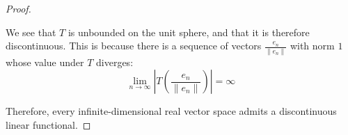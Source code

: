 \documentclass[12pt]{article}
\theoremstyle{definition}
\begin{document}
\begin{proof}
\begin{enumerate}[label=(\roman*)]
	\par We see that $T$ is unbounded on the unit sphere, and that it is therefore discontinuous. This is because there is a sequence of vectors $\frac{e_n}{\lVert e_n \rVert}$ with norm $1$ whose value under $T$ diverges:
	\[
	\lim_{n\to\infty} \left \lvert T\left ( \frac{e_n}{\lVert e_n \rVert}\right )  \right \rvert = \infty
	\]
	\end{enumerate}
	Therefore, every infinite-dimensional real vector space admits a discontinuous linear functional.
\end{proof}
\begin{thebibliography}{}


\end{thebibliography}
\end{document}
